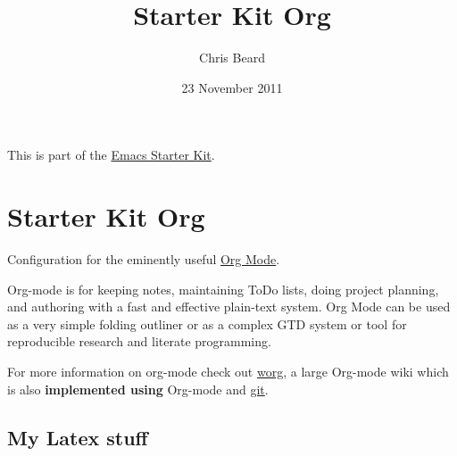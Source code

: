 \documentclass[11pt]{article}
\begin{document}
\title{Starter Kit Org}
\author{Chris Beard}
\date{23 November 2011}
\maketitle


This is part of the \href{file:///Users/FingerMan/.emacs.d/starter-kit.org}{Emacs Starter Kit}.

\section*{Starter Kit Org}
\label{sec-1}

Configuration for the eminently useful \href{http://orgmode.org/}{Org Mode}.

Org-mode is for keeping notes, maintaining ToDo lists, doing project
planning, and authoring with a fast and effective plain-text system.
Org Mode can be used as a very simple folding outliner or as a complex
GTD system or tool for reproducible research and literate programming.

For more information on org-mode check out \href{http://orgmode.org/worg/}{worg}, a large Org-mode wiki
which is also \textbf{implemented using} Org-mode and \href{http://git-scm.com/}{git}.
\subsection*{My Latex stuff}
\label{sec-1_1}
\end{document}
